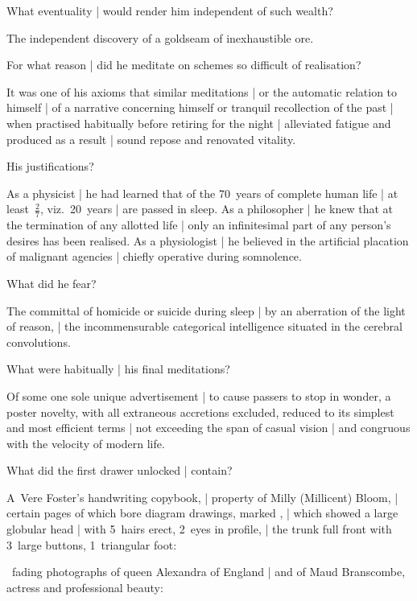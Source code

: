 What eventuality |
would render him independent of such wealth?

\Factual
The independent discovery of a goldseam of inexhaustible ore.


For what reason |
did he meditate on schemes so difficult of realisation?

\Philosophy
It was one of his axioms that similar meditations |
or the automatic relation to himself |
of a narrative concerning himself
or tranquil recollection of the past |
when practised habitually before retiring for the night |
alleviated fatigue and produced as a result |
sound repose and renovated vitality.


His justifications?

\Science
As a physicist |
he had learned that
of the 70~years of complete human life |
at least~$\frac{2}{7}$, viz.\ 20~years |
are passed in sleep.
As a philosopher |
he knew that at the termination of any allotted life |
only an infinitesimal part of any person's desires has been realised.
As a physiologist |
he believed in the artificial placation of malignant agencies |
chiefly operative during somnolence.


What did he fear?

\Science
The committal of homicide or suicide during sleep |
by an aberration of the light of reason, |
the incommensurable categorical intelligence situated in the cerebral convolutions.



What were habitually |
his final meditations?

\Adverts
Of some one sole unique advertisement |
to cause passers to stop in wonder,
a poster novelty,
with all extraneous accretions excluded,
reduced to its simplest and most efficient terms |
not exceeding the span of casual vision |
and congruous with the velocity of modern life.


What did the first drawer unlocked |
contain?

\Household
A~Vere Foster's handwriting copybook, |
property of Milly (Millicent) Bloom, |
certain pages of which bore diagram drawings, marked , |
which showed a large globular head |
with 5~hairs erect, 2~eyes in profile, |
the trunk full front with 3~large buttons, 1~triangular foot:

~fading photographs of queen Alexandra of England |
and of Maud Branscombe, actress and professional beauty:

